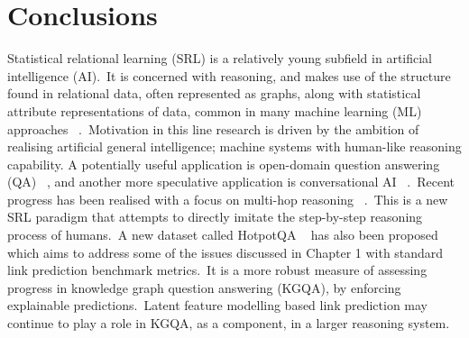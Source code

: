 
\chapter{Conclusions}  %

\ifpdf
    \graphicspath{{Chapter5/Figs/Raster/}{Chapter5/Figs/PDF/}{Chapter5/Figs/}}
\else
    \graphicspath{{Chapter5/Figs/Vector/}{Chapter5/Figs/}}
\fi



Statistical relational learning (SRL) is a relatively young subfield in artificial intelligence (AI).\ It is concerned with reasoning, and makes use of the structure found in relational data, often represented as graphs, along with statistical attribute representations of data, common in many machine learning (ML) approaches \unskip~\citep{koller2007introduction}.\ Motivation in this line research is driven by the ambition of realising artificial general intelligence; machine systems with human-like reasoning capability. A potentially useful application is open-domain question answering (QA) \unskip~\citep{chen2017reading}, and another more speculative application is conversational AI \unskip~\citep{moon2019opendialkg, basu2019conversational}.\ Recent progress has been realised with a focus on multi-hop reasoning \unskip~\citep{asai2019learning, lin2018multi, qi2019answering}.\ This is a new SRL paradigm that attempts to directly imitate the step-by-step reasoning process of humans.\ A new dataset called HotpotQA \unskip~\citep{yang2018hotpotqa} has also been proposed which aims to address some of the issues discussed in Chapter 1 with standard link prediction benchmark metrics.\ It is a more robust measure of assessing progress in knowledge graph question answering (KGQA), by enforcing explainable predictions.\ Latent feature modelling based link prediction may continue to play a role in KGQA, as a component, in a larger reasoning system. \par   

